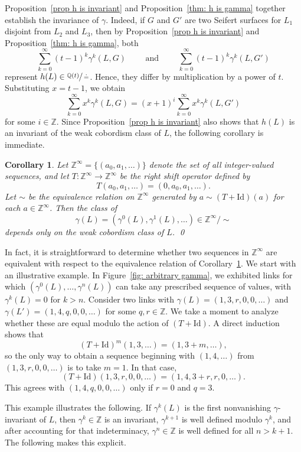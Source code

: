 \documentclass[a4paper, 11pt]{amsart}
\newtheorem{corollary}[theorem]{Corollary}
\theoremstyle{definition}
\newcommand{\Q}{\mathbb{Q}}
\newcommand{\Z}{\mathbb{Z}}
\begin{document}
Proposition~\ref{prop h is invariant} and Proposition~\ref{thm: h is gamma} together establish the invariance of $\gamma$. Indeed, if $G$ and $G'$ are two Seifert surfaces for $L_1$ disjoint from $L_2$ and $L_3$, then by Proposition~\ref{prop h is invariant} and Proposition~\ref{thm: h is gamma}, both
\[
\sum_{k=0}^\infty (t-1)^k \gamma^k(L,G)
\qquad\text{ and }\qquad
\sum_{k=0}^\infty (t-1)^k \gamma^k(L,G')
\]
represent $h(L)\in \sfrac{\Q(t)}{\doteq}$. Hence, they differ by multiplication by a power of $t$. Substituting $x=t-1$, we obtain
\[
\sum_{k=0}^\infty x^k \gamma^k(L,G)=(x+1)^i\sum_{k=0}^\infty x^k \gamma^k(L,G')
\]
for some $i\in \Z$. Since Proposition~\ref{prop h is invariant} also shows that $h(L)$ is an invariant of the weak cobordism class of $L$, the following corollary is immediate.

\begin{corollary}\label{corollary: well defined}
Let $\Z^\infty=\{(a_0,a_1,\dots)\}$ denote the set of all integer-valued sequences, and let $T\colon \Z^\infty\to \Z^\infty$ be the right shift operator defined by
\[
T(a_0,a_1,\dots)=(0,a_0,a_1,\dots).
\]
Let $\sim$ be the equivalence relation on $\Z^\infty$ generated by
$a\sim (T+\mathrm{Id})(a)$
for each $a\in \Z^\infty$. Then the class of
\[
\gamma(L)=(\gamma^0(L),\gamma^1(L),\dots)\in \Z^\infty/{\sim}
\]
depends only on the weak cobordism class of $L$. \qed
\end{corollary}

In fact, it is straightforward to determine whether two sequences in $\Z^\infty$ are equivalent with respect to the equivalence relation of Corollary~\ref{corollary: well defined}.  We start with an illustrative example. In Figure~\ref{fig: arbitrary gamma}, we exhibited links for which $(\gamma^0(L),\dots,\gamma^n(L))$ can take any prescribed sequence of values, with $\gamma^k(L)=0$ for $k>n$. Consider two links with $\gamma(L)=(1,3,r,0,0,\dots)$ and $\gamma(L')=(1,4,q,0,0,\dots)$ for some $q,r\in \Z$. We take a moment to analyze whether these are equal modulo the action of $(T+\mathrm{Id})$. A direct induction shows that $$(T+\mathrm{Id})^m(1,3,\dots)=(1,3+m,\dots),$$ so the only way to obtain a sequence beginning with $(1,4,\dots)$ from $(1,3,r,0,0,\dots)$ is to take $m=1$. In that case,
\[
(T+\mathrm{Id})(1,3,r,0,0,\dots)=(1,4,3+r,r,0,\dots).
\]
This agrees with $(1,4,q,0,0,\dots)$ only if $r=0$ and $q=3$.

This example illustrates the following. If $\gamma^k(L)$ is the first nonvanishing $\gamma$-invariant of $L$, then $\gamma^k\in \Z$ is an invariant, $\gamma^{k+1}$ is well defined modulo $\gamma^k$, and after accounting for that indeterminacy, $\gamma^n\in \Z$ is well defined for all $n>k+1$. The following makes this explicit.
\end{document}
